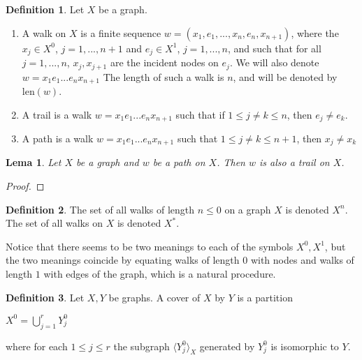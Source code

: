 \documentclass[]{article}
\newtheorem{lemma}{Lema}[section]
\theoremstyle{definition}
\newtheorem{definition}{Definition}[section]
\theoremstyle{definition}
\begin{document}
	\begin{definition}
		Let $X$ be a graph.
		
		\begin{enumerate}
			\item A walk on $X$ is a finite sequence $w = (x_1, e_1, ..., x_{n}, e_{n}, x_{n+1})$, where the $x_j \in X^0$, $j=1, ..., n+1$ and $e_j \in X^1$, $j=1, ..., n$, and such that for all $j=1,...,n$, $x_j, x_{j+1}$ are the incident nodes on $e_j$. We will also denote $w = x_1e_1...e_nx_{n+1}$ The length of such a walk is $n$, and will be denoted by $\text{len}(w)$.
			
			\item A trail is a walk $ w = x_1e_1...e_nx_{n+1}$ such that if $1 \leq j \neq k \leq n$, then $e_j \neq e_k$.
			
			\item A path is a walk $w = x_1e_1...e_nx_{n+1}$ such that $1 \leq j \neq k \leq n+1$, then $x_j \neq x_k$ 
		\end{enumerate}
	\end{definition}
	
	\begin{lemma}
		Let $X$ be a graph and $w$ be a path on $X$. Then $w$ is also a trail on $X$.
	\end{lemma}
	
	\begin{proof}
		
		
	\end{proof}
	
	\begin{definition}
		The set of all walks of length $n \leq 0$ on a graph $X$ is denoted $X^n$. The set of all walks on $X$ is denoted $X^*$.
	\end{definition}
	
	Notice that there seems to be two meanings to each of the symbols $X^0, X^1$, but the two meanings coincide by equating walks of length $0$ with nodes and walks of length $1$ with edges of the graph, which is a natural procedure.
	
	\begin{definition}
		Let $X, Y$ be graphs. A cover of $X$ by $Y$ is a partition 
		
		\begin{center}
			$X^0=\bigcup_{j=1}^r Y^0_j$
		\end{center}
		
		\noindent where for each $1 \leq j \leq r$ the subgraph $\langle Y^0_j \rangle_X$ generated by $Y_j^0$ is isomorphic to $Y$.
	\end{definition}
	
\end{document}

